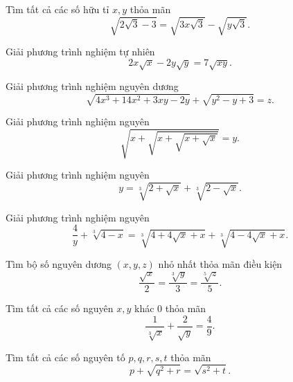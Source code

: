 \begin{btt}
Tìm tất cả các số hữu tỉ $x,y$ thỏa mãn
$$\sqrt{2\sqrt{3}-3}=\sqrt{3x\sqrt{3}}-\sqrt{y\sqrt{3}}.$$
\end{btt}

\begin{btt}
Giải phương trình nghiệm tự nhiên
\[2x\sqrt{x}-2y\sqrt{y}=7\sqrt{xy}.\]
\end{btt}

\begin{btt}
Giải phương trình nghiệm nguyên dương
\[\sqrt{4x^3+14x^2+3xy-2y}+\sqrt{y^2-y+3}=z.\]
\end{btt} 

\begin{btt}
Giải phương trình nghiệm nguyên
\[\sqrt{x+\sqrt{x+\sqrt{x+\sqrt{x}}}}=y.\]
\end{btt}

\begin{btt}
Giải phương trình nghiệm nguyên
\[y=\sqrt[3]{2+\sqrt{x}}+\sqrt[3]{2-\sqrt{x}}.\]
\end{btt}

\begin{btt}
Giải phương trình nghiệm nguyên \[\dfrac{4}{y}+\sqrt[3]{4-x}=\sqrt[3]{4+4\sqrt{x}+x}+\sqrt[3]{4-4\sqrt{x}+x}.\]
\end{btt}

\begin{btt}
Tìm bộ số nguyên dương $(x,y,z)$ nhỏ nhất thỏa mãn điều kiện
\[\dfrac{\sqrt{x}}{2}=\dfrac{\sqrt[3]{y}}{3}=\dfrac{\sqrt[5]{z}}{5}.\]
\end{btt}

\begin{btt}
Tìm tất cả các số nguyên $x,y$ khác $0$ thỏa mãn 
\[\dfrac{1}{\sqrt[3]{x}}+\dfrac{2}{\sqrt{y}}=\dfrac{4}{9}.\]
\end{btt}


\begin{btt}
Tìm tất cả các số nguyên tố $p,q,r,s,t$ thỏa mãn $$p+\sqrt{q^{2}+r}=\sqrt{s^{2}+t}.$$
\end{btt}

